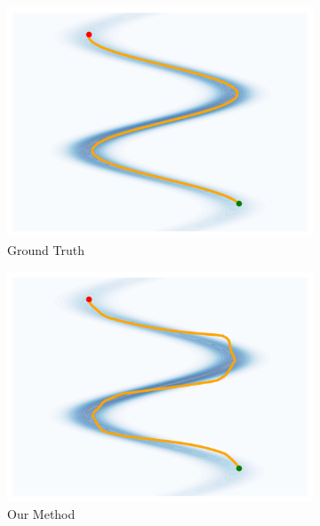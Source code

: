     \begin{figure}[htbp]
        \centering
        \begin{subfigure}[b]{0.18\textwidth}
        \includegraphics[width=\textwidth]{chapter5/results/visualisations/geodesics/gt.png}
        \caption{\scriptsize Ground Truth}
        \end{subfigure}
        \begin{subfigure}[b]{0.18\textwidth}
        \includegraphics[width=\textwidth]{chapter5/results/visualisations/geodesics/ours.png}
        \caption{\scriptsize Our Method}
        \end{subfigure}
        \begin{subfigure}[b]{0.18\textwidth}

\end{subfigure}
\end{figure}
